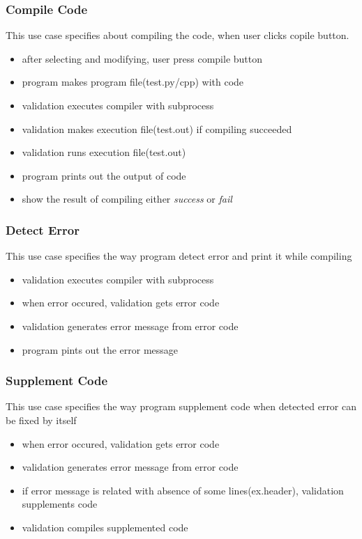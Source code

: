 \documentclass[conference]{IEEEtran}
\begin{document}
\subsubsection{Compile Code}
This use case specifies about compiling the code, when user clicks copile button.
\begin{itemize}
  \item after selecting and modifying, user press compile button
  \item program makes program file(test.py/cpp) with code
  \item validation executes compiler with subprocess
  \item validation makes execution file(test.out) if compiling succeeded
  \item validation runs execution file(test.out)
  \item program prints out the output of code
  \item show the result of compiling either \textit{success} or \textit{fail}
\end{itemize}
\textit{}



\subsubsection{Detect Error}
This use case specifies the way program detect error and print it while compiling

\begin{itemize}
  \item validation executes compiler with subprocess   
  \item when error occured, validation gets error code
  \item validation generates error message from error code
  \item program pints out the error message
\end{itemize}
\textit{}



\subsubsection{Supplement Code}
This use case specifies the way program supplement code when detected error can be fixed by itself
\begin{itemize}
  \item when error occured, validation gets error code
  \item validation generates error message from error code
  \item if error message is related with absence of some lines(ex.header), validation supplements code
  \item validation compiles supplemented code
\end{itemize}
\textit{}
\end{document}
